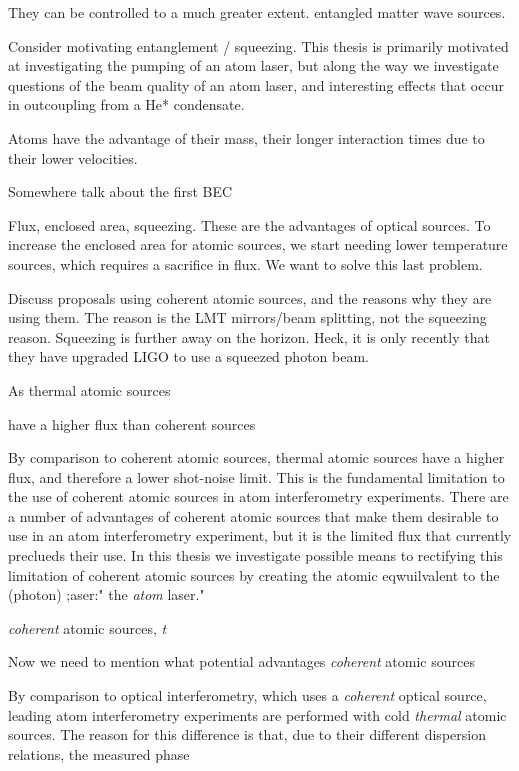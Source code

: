 They can be controlled to a much greater extent. entangled matter wave sources.

Consider motivating entanglement / squeezing.  This thesis is primarily motivated at investigating the pumping of an atom laser, but along the way we investigate questions of the beam quality of an atom laser, and interesting effects that occur in outcoupling from a He* condensate.

Atoms have the advantage of their mass, their longer interaction times due to their lower velocities.



Somewhere talk about the first BEC

Flux, enclosed area, squeezing.  These are the advantages of optical sources.  To increase the enclosed area for atomic sources, we start needing lower temperature sources, which requires a sacrifice in flux.  We want to solve this last problem.


Discuss proposals using coherent atomic sources, and the reasons why they are using them.  The reason is the LMT mirrors/beam splitting, not the squeezing reason.  Squeezing is further away on the horizon.  Heck, it is only recently that they have upgraded LIGO to use a squeezed photon beam.

As thermal atomic sources 

have a higher flux than coherent sources




By comparison to coherent atomic sources, thermal atomic sources have a higher flux, and therefore a lower shot-noise limit.  This is the fundamental limitation to the use of coherent atomic sources in atom interferometry experiments.  There are a number of advantages of coherent atomic sources that make them desirable to use in an atom interferometry experiment, but it is the limited flux that currently preclueds their use.  In this thesis we investigate possible means to rectifying this limitation of coherent atomic sources by creating the atomic eqwuilvalent to the (photon) ;aser:" the \emph{atom} laser."

 \emph{coherent} atomic sources, \emph{t}

Now we need to mention what potential advantages \emph{coherent} atomic sources

By comparison to optical interferometry, which uses a \emph{coherent} optical source, leading atom interferometry experiments are performed with cold \emph{thermal} atomic sources.  The reason for this difference is that, due to their different dispersion relations, the measured phase

